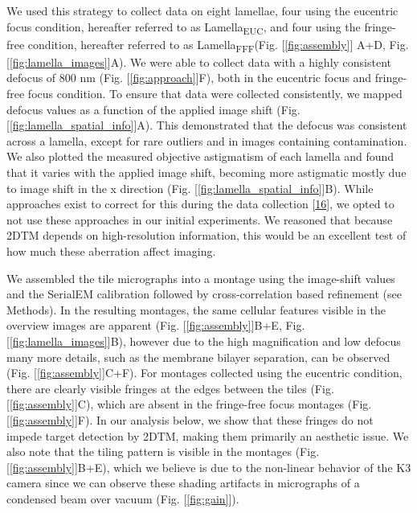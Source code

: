 \documentclass[
]{article}
\begin{document}
We used this strategy to collect data on eight lamellae, four using the
eucentric focus condition, hereafter referred to as Lamella\textsubscript{EUC}, and four using
the fringe-free condition, hereafter referred to as Lamella\textsubscript{FFF}(Fig.
{[}\ref{fig:assembly}{]} A+D, Fig.
{[}\ref{fig:lamella_images}{]}A). We were able to collect data with a highly
consistent defocus of 800 nm (Fig. {[}\ref{fig:approach}{]}F), both in the eucentric
focus and fringe-free focus condition. To ensure that data were collected
consistently, we mapped defocus values as a function of the applied image shift
(Fig. {[}\ref{fig:lamella_spatial_info}{]}A). This demonstrated that the defocus was
consistent across a lamella, except for rare outliers and in images containing
contamination. We also plotted the measured objective astigmatism of each
lamella and found that it varies with the applied image shift, becoming more
astigmatic mostly due to image shift in the x direction (Fig.
{[}\ref{fig:lamella_spatial_info}{]}B). While approaches exist to correct for this
during the data collection {[}\protect\hyperlink{ref-APSL9LmU}{16}{]}, we opted to not use these approaches in our
initial experiments. We reasoned that because 2DTM depends on high-resolution
information, this would be an excellent test of how much these aberration affect
imaging.

We assembled the tile micrographs into a montage using the image-shift values
and the SerialEM calibration followed by cross-correlation based refinement (see
Methods). In the resulting montages, the same cellular features visible in the
overview images are apparent (Fig. {[}\ref{fig:assembly}{]}B+E, Fig. {[}\ref{fig:lamella_images}{]}B), however
due to the high magnification and low defocus many more details, such as the
membrane bilayer separation, can be observed (Fig. {[}\ref{fig:assembly}{]}C+F). For montages collected using the
eucentric condition, there are clearly visible fringes at the edges between the
tiles (Fig. {[}\ref{fig:assembly}{]}C), which are absent in the fringe-free focus montages (Fig. {[}\ref{fig:assembly}{]}F). In our analysis
below, we show that these fringes do not impede target detection by 2DTM, making
them primarily an aesthetic issue. We also note that the tiling
pattern is visible in the montages (Fig. {[}\ref{fig:assembly}{]}B+E), which we believe is due to the non-linear
behavior of the K3 camera since we can observe these shading artifacts in micrographs of a condensed beam over vacuum (Fig. {[}\ref{fig:gain}{]}).
\end{document}
